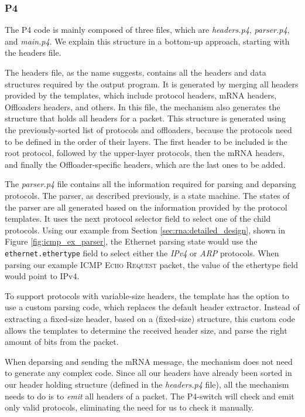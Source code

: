 \subsubsection*{P4}

The P4 code is mainly composed of three files, which are \textit{headers.p4}, \textit{parser.p4}, and \textit{main.p4}. We explain this structure in a bottom-up approach, starting with the headers file.

The headers file, as the name suggests, contains all the headers and data structures required by the output program. It is generated by merging all headers provided by the templates, which include protocol headers, mRNA headers, Offloaders headers, and others. In this file, the mechanism also generates the structure that holds all headers for a packet. This structure is generated using the previously-sorted list of protocols and offloaders, because the protocols need to be defined in the order of their layers. The first header to be included is the root protocol, followed by the upper-layer protocols, then the mRNA headers, and finally the Offloader-specific headers, which are the last ones to be added.

The \textit{parser.p4} file contains all the information required for parsing and deparsing protocols. The parser, as described previously, is a state machine. The states of the parser are all generated based on the information provided by the protocol templates. It uses the next protocol selector field to select one of the child protocols. Using our example from Section \ref{sec:rna:detailed_design}, shown in Figure \ref{fig:icmp_ex_parser}, the Ethernet parsing state would use the \texttt{ethernet.ethertype} field to select either the \textit{IPv4} or \textit{ARP} protocols. When parsing our example \textsc{ICMP Echo Request} packet, the value of the ethertype field would point to IPv4.

To support protocols with variable-size headers, the template has the option to use a custom parsing code, which replaces the default header extractor. Instead of extracting a fixed-size header, based on a (fixed-size) structure, this custom code allows the templates to determine the received header size, and parse the right amount of bits from the packet.

When deparsing and sending the mRNA message, the mechanism does not need to generate any complex code. Since all our headers have already been sorted in our header holding structure (defined in the \textit{headers.p4} file), all the mechanism needs to do is to \textit{emit} all headers of a packet. The P4-switch will check and emit only valid protocols, eliminating the need for us to check it manually.

